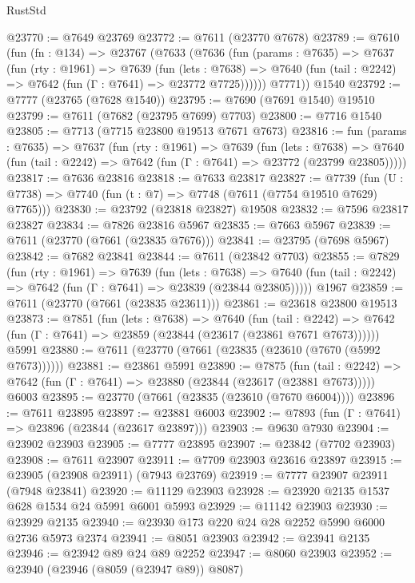 \begin{lexlean}{RustStd}
\begin{coremodule}
{\begin{coremodule}
{{{{{{{{{{{{{{{{{{{{{{{{{{{{{{{{{{@23770 := @7649 @23769
@23772 := @7611 (@23770 @7678)
@23789 := @7610
    (fun (fn : @134) =>
    @23767
      (@7633
        (@7636
          (fun (params : @7635) =>
          @7637
            (fun (rty : @1961) =>
            @7639
              (fun (lets : @7638) =>
              @7640 (fun (tail : @2242) => @7642 (fun (Γ : @7641) => @23772 @7725))))))
        @7771))
    @1540
@23792 := @7777 (@23765 (@7628 @1540))
@23795 := @7690 (@7691 @1540) @19510
@23799 := @7611 (@7682 (@23795 @7699) @7703)
@23800 := @7716 @1540
@23805 := @7713 (@7715 @23800 @19513 @7671 @7673)
@23816 := fun (params : @7635) =>
  @7637
    (fun (rty : @1961) =>
    @7639
      (fun (lets : @7638) =>
      @7640 (fun (tail : @2242) => @7642 (fun (Γ : @7641) => @23772 (@23799 @23805)))))
@23817 := @7636 @23816
@23818 := @7633 @23817
@23827 := @7739
    (fun (U : @7738) => @7740 (fun (t : @7) => @7748 (@7611 (@7754 @19510 @7629) @7765)))
@23830 := @23792 (@23818 @23827) @19508
@23832 := @7596 @23817 @23827
@23834 := @7826 @23816 @5967
@23835 := @7663 @5967
@23839 := @7611 (@23770 (@7661 (@23835 @7676)))
@23841 := @23795 (@7698 @5967)
@23842 := @7682 @23841
@23844 := @7611 (@23842 @7703)
@23855 := @7829
    (fun (rty : @1961) =>
    @7639
      (fun (lets : @7638) =>
      @7640 (fun (tail : @2242) => @7642 (fun (Γ : @7641) => @23839 (@23844 @23805)))))
    @1967
@23859 := @7611 (@23770 (@7661 (@23835 @23611)))
@23861 := @23618 @23800 @19513
@23873 := @7851
    (fun (lets : @7638) =>
    @7640
      (fun (tail : @2242) =>
      @7642 (fun (Γ : @7641) => @23859 (@23844 (@23617 (@23861 @7671 @7673))))))
    @5991
@23880 := @7611 (@23770 (@7661 (@23835 (@23610 (@7670 (@5992 @7673))))))
@23881 := @23861 @5991
@23890 := @7875
    (fun (tail : @2242) => @7642 (fun (Γ : @7641) => @23880 (@23844 (@23617 (@23881 @7673)))))
    @6003
@23895 := @23770 (@7661 (@23835 (@23610 (@7670 @6004))))
@23896 := @7611 @23895
@23897 := @23881 @6003
@23902 := @7893 (fun (Γ : @7641) => @23896 (@23844 (@23617 @23897)))
@23903 := @9630 @7930
@23904 := @23902 @23903
@23905 := @7777 @23895
@23907 := @23842 (@7702 @23903)
@23908 := @7611 @23907
@23911 := @7709 @23903 @23616 @23897
@23915 := @23905 (@23908 @23911) (@7943 @23769)
@23919 := @7777 @23907 @23911 (@7948 @23841)
@23920 := @11129 @23903
@23928 := @23920 @2135 @1537 @628 @1534 @24 @5991 @6001 @5993
@23929 := @11142 @23903
@23930 := @23929 @2135
@23940 := @23930 @173 @220 @24 @28 @2252 @5990 @6000 @2736 @5973 @2374
@23941 := @8051 @23903
@23942 := @23941 @2135
@23946 := @23942 @89 @24 @89 @2252
@23947 := @8060 @23903
@23952 := @23940 (@23946 (@8059 (@23947 @89)) @8087)
}}}}}}}}}}}}}}}}}}}}}}}}}}}}}}}}}}
\end{coremodule}}
\end{coremodule}
\end{lexlean}
